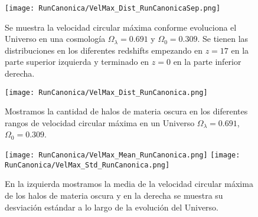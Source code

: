 
\begin{figure}[H]
    \centering
    \texttt{[image: RunCanonica/VelMax\_Dist\_RunCanonicaSep.png]}
    \caption[Velocidad circular máxima en la evolución de un Universo $\Omega_\lambda = 0.691 $, $\Omega_0 = 0.309$]{\footnotesize Se muestra la velocidad circular máxima conforme evoluciona el Universo en una cosmología $\Omega_\lambda = 0.691 $ y $\Omega_0 = 0.309$. Se tienen las distribuciones en los diferentes redshifts empezando en $z=17$ en la parte superior izquierda y terminado en $z=0$ en la parte inferior derecha.}
    \label{fig:Canon-VelMaxDistSep}
\end{figure}

\begin{figure}[H]
    \centering
    \texttt{[image: RunCanonica/VelMax\_Dist\_RunCanonica.png]}
    \caption[Distribución de la velocidad circular máxima de un Universo $\Omega_\lambda = 0.691 $, $\Omega_0 = 0.309$]{\footnotesize Mostramos la cantidad de halos de materia oscura en los diferentes rangos de velocidad circular máxima en un Universo $\Omega_\lambda = 0.691 $, $\Omega_0 = 0.309$.}
    \label{fig:Canon-VelMaxDist}
\end{figure}

\begin{figure}[H]
    \centering
    \texttt{[image: RunCanonica/VelMax\_Mean\_RunCanonica.png]}
    \texttt{[image: RunCanonica/VelMax\_Std\_RunCanonica.png]}
    \caption[Media y desviación estándar de la velocidad circular máxima de un Universo $\Omega_\lambda = 0.691 $, $\Omega_0 = 0.309$]{\footnotesize En la izquierda mostramos la media de la velocidad circular máxima de los halos de materia oscura y en la derecha se muestra su desviación estándar a lo largo de la evolución del Universo.}
    \label{fig:Canon-VelMaxStats}
\end{figure}


